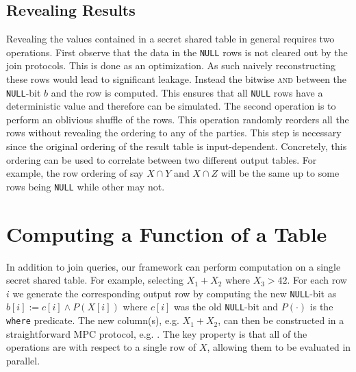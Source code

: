 \subsection{Revealing Results}

Revealing the values contained in a secret shared table in general requires two operations. First observe that the data in the \texttt{NULL} rows is not cleared out by the join protocols. This is done as an optimization. As such naively reconstructing these rows would lead to significant leakage. Instead the bitwise \textsc{and} between the \texttt{NULL}-bit $b$ and the row is computed. This ensures that all \texttt{NULL} rows have a deterministic value and therefore can be simulated. The second operation is to perform an oblivious shuffle of the rows. This operation randomly reorders all the rows without revealing the ordering to any of the parties. This step is necessary since the original ordering of the result table is input-dependent. Concretely, this ordering can be used to correlate between two different output tables. For example, the row ordering of say $X\cap Y$ and $X\cap Z$ will be the same up to some rows being \texttt{NULL} while other may not. %


\section{Computing a Function of a Table}\label{sec:card}

In addition to join queries, our framework can perform computation on a single secret shared table. For example, selecting $X_1+X_2$  where $X_3>42$. For each row $i$ we generate the corresponding output row by computing the new \texttt{NULL}-bit as $b[i] := c[i] \wedge P(X[i])$ where $c[i]$ was the old \texttt{NULL}-bit and $P(\cdot)$ is the \texttt{where} predicate. The new column(s), e.g. $X_1+X_2$, can then be constructed in a straightforward MPC protocol, e.g. \cite{aby3}. The key property is that all of the operations are with respect to a single row of $X$, allowing them to be evaluated in parallel. 

